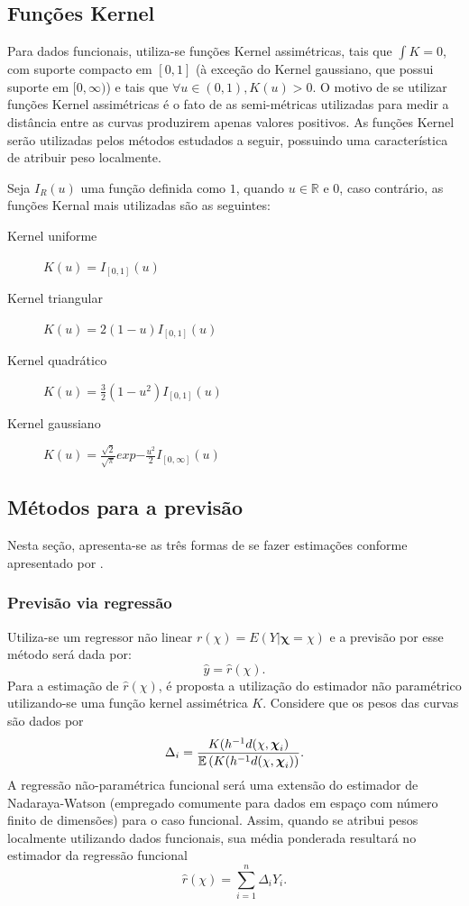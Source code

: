 \documentclass[
	12pt,				%
	openright,			%
	oneside,			%
	a4paper,			%
	english,			%
	brazil				%
	]{dissertacao-ufrgs-abntex2}
\begin{document}
\subsection{Funções Kernel}

Para dados funcionais, utiliza-se funções Kernel assimétricas, tais que $\int K = 0$, com suporte compacto em $[0,1]$ (à exceção do Kernel gaussiano, que possui suporte em $[0,\infty)$) e tais que $\forall u \in (0,1), K(u) > 0$. O motivo de se utilizar funções Kernel assimétricas é o fato de as semi-métricas utilizadas para medir a distância entre as curvas produzirem apenas valores positivos. As funções Kernel serão utilizadas pelos métodos estudados a seguir, possuindo uma característica de atribuir peso localmente.

Seja $I_R(u)$ uma função definida como $1$, quando $u \in \mathbb{R}$ e 0, caso contrário, as funções Kernal mais utilizadas são as seguintes:
\begin{description}
	\item[Kernel uniforme] $K(u)= I_{[0,1]}(u)$
    \item[Kernel triangular] $K(u)= 2(1-u)I_{[0,1]}(u)$
    \item[Kernel quadrático] $K(u)= \frac {3}{2} (1 - u^2) I_{[0,1]}(u)$
    \item[Kernel gaussiano] $K(u)= \frac {\sqrt{2}}{\sqrt{\pi}} exp{-\frac{u^2}{2}} I_{[0,\infty]}(u)$
\end{description}

\subsection{Métodos para a previsão}
\label{metodos-previsao-npfda}

Nesta seção, apresenta-se as três formas de se fazer estimações conforme apresentado por .


\subsubsection*{Previsão via regressão}

Utiliza-se um regressor não linear $r(\chi)=E(Y|\boldsymbol{\chi}=\chi)$
e a previsão por esse método será dada por:
\[
\hat{y}=\hat{r}(\chi).
\]
Para a estimação de $\hat{r}(\chi)$, é proposta a utilização do estimador
não paramétrico utilizando-se uma função kernel assimétrica $K$. Considere que os pesos das curvas são dados por
\begin{equation} \label{peso-local}
\Delta_i=\frac{K(h^{-1}d(\chi,\boldsymbol{\chi}_{i})}{\mathbb{E} \left( K(h^{-1}d(\chi,\boldsymbol{\chi}_{i}) \right)}.
\end{equation}
A regressão não-paramétrica funcional será uma extensão do estimador de Nadaraya-Watson (empregado comumente para dados em espaço com número finito de dimensões) para o caso funcional. 
Assim, quando se atribui pesos localmente utilizando dados funcionais, sua média ponderada resultará no estimador da regressão funcional
\begin{equation}
	\hat{r}(\chi) = \sum_{i=1}^n \Delta_i Y_i.
\end{equation}
\end{document}
